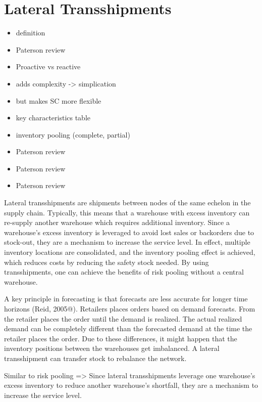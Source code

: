 \documentclass[../../main.tex]{subfiles}
\begin{document}

\section{Lateral Transshipments}

\begin{itemize}
\item definition
\item Paterson review
\item Proactive vs reactive
\item adds complexity -> simplication
\item but makes SC more flexible
\item key characteristics table
\item inventory pooling (complete, partial)
\item Paterson review
\item Paterson review
\item Paterson review
\end{itemize}



Lateral transshipments are shipments between nodes of the same echelon in the supply chain. Typically, this means that a warehouse with excess inventory can re-supply another warehouse which requires additional inventory. Since a warehouse's excess inventory is leveraged to avoid lost sales or backorders due to stock-out, they are a mechanism to increase the service level. In effect, multiple inventory locations are consolidated, and the inventory pooling effect is achieved, which reduces costs by reducing the safety stock needed. By using transshipments, one can achieve the benefits of risk pooling without a central warehouse. 

A key principle in forecasting is that forecasts are less accurate for longer time horizons (Reid, 2005@). Retailers places orders based on demand forecasts. From the retailer places the order until the demand is realized. The actual realized demand can be completely different than the forecasted demand at the time the retailer places the order. Due to these differences, it might happen that the inventory positions between the warehouses get imbalanced. A lateral transshipment can transfer stock to rebalance the network. 

Similar to risk pooling => Since lateral transshipments leverage one warehouse's excess inventory to reduce another warehouse's shortfall, they are a mechanism to increase the service level.
\end{document}
